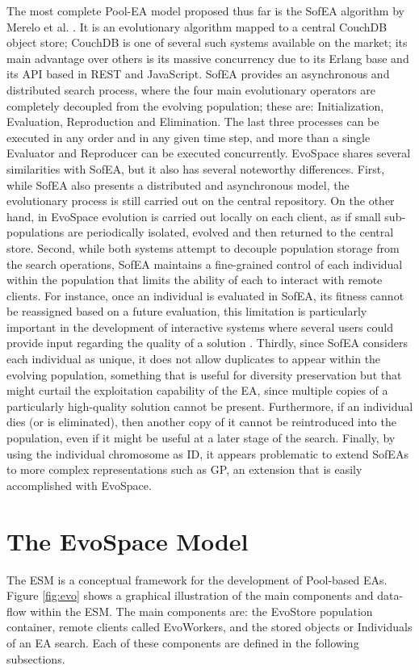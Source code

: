 The most complete Pool-EA model proposed thus far is the SofEA algorithm by Merelo et al. \cite{sofea1,sofea2,sofea3}.
It is an evolutionary algorithm mapped to a central CouchDB object store;
CouchDB is one of several such systems available on the market; its main advantage over others is its massive concurrency due
to its Erlang base and its API based in REST and JavaScript.
SofEA provides an asynchronous and distributed search process,
where the four main evolutionary operators are completely decoupled from the evolving population; these are: Initialization, Evaluation, Reproduction and Elimination.
The last three processes can be executed in any order and in any given time step, and more than a single Evaluator and Reproducer can be
executed concurrently.
EvoSpace shares several similarities with SofEA, but it also has several noteworthy differences.
First, while SofEA also presents a distributed and asynchronous model, the evolutionary process is still carried out on the central repository.
On the other hand, in EvoSpace evolution is carried out locally on each client, as if small sub-populations are periodically isolated, evolved and then returned to the central store.
Second, while both systems attempt to decouple population storage from the search operations, SofEA maintains a fine-grained control of each individual
within the population that limits the ability of each to interact with remote clients.
For instance, once an individual is evaluated in SofEA, its fitness cannot be reassigned based on a future evaluation,
this limitation is particularly important in the development of interactive systems where several users could provide input regarding the quality of a solution \cite{Musart}.
Thirdly, since SofEA considers each individual as unique, it does not allow duplicates to appear within the evolving population, something that is useful for diversity preservation but that might curtail the exploitation capability of the EA, since multiple copies of a particularly high-quality solution cannot be present.
Furthermore, if an individual dies (or is eliminated), then another copy of it cannot be reintroduced into the population,
even if it might be useful at a later stage of the search.
Finally, by using the individual chromosome as ID, it appears problematic to extend SofEAs to more complex representations such as GP,
an extension that is easily accomplished with EvoSpace.

\section{The EvoSpace Model} %
\label{sec:evospace}
The ESM is a conceptual framework for the development of Pool-based EAs. Figure \ref{fig:evo} shows a graphical illustration of the main components and data-flow within the ESM. The main components are: the EvoStore population container, remote clients called EvoWorkers, and the stored objects or Individuals of an EA search.
Each of these components are defined in the following subsections.

